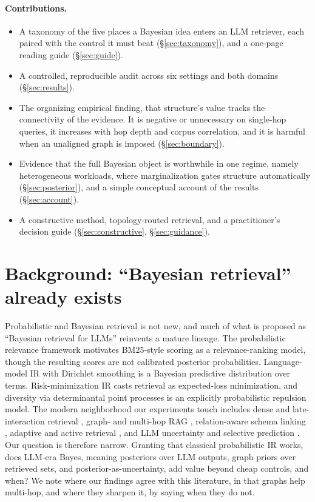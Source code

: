\documentclass[11pt]{article}
\begin{document}
\paragraph{Contributions.}
\begin{itemize}[leftmargin=1.4em,itemsep=2pt]
\item A taxonomy of the five places a Bayesian idea enters an LLM retriever, each paired with the
control it must beat (\S\ref{sec:taxonomy}), and a one-page reading guide (\S\ref{sec:guide}).
\item A controlled, reproducible audit across six settings and both domains (\S\ref{sec:results}).
\item The organizing empirical finding, that structure's value tracks the connectivity of the
evidence. It is negative or unnecessary on single-hop queries, it increases with hop depth and corpus
correlation, and it is harmful when an unaligned graph is imposed (\S\ref{sec:boundary}).
\item Evidence that the full Bayesian object is worthwhile in one regime, namely heterogeneous
workloads, where marginalization gates structure automatically (\S\ref{sec:posterior}), and a simple
conceptual account of the results (\S\ref{sec:account}).
\item A constructive method, topology-routed retrieval, and a practitioner's decision guide
(\S\ref{sec:constructive}, \S\ref{sec:guidance}).
\end{itemize}

\section{Background: ``Bayesian retrieval'' already exists}\label{sec:background}

Probabilistic and Bayesian retrieval is not new, and much of what is proposed as ``Bayesian retrieval
for LLMs'' reinvents a mature lineage. The probabilistic relevance framework
\citep{robertson1976relevance} motivates BM25-style scoring \citep{robertson2009bm25} as a
relevance-ranking model, though the resulting scores are not calibrated posterior probabilities.
Language-model IR \citep{ponte1998lm} with Dirichlet smoothing \citep{zhai2004smoothing} is a Bayesian
predictive distribution over terms. Risk-minimization IR \citep{zhai2006risk} casts retrieval as
expected-loss minimization, and diversity via determinantal point processes \citep{kulesza2012dpp} is
an explicitly probabilistic repulsion model. The modern neighborhood our experiments touch includes
dense and late-interaction retrieval \citep{khattab2020colbert}, graph- and multi-hop RAG
\citep{edge2024graphrag,gutierrez2024hipporag}, relation-aware schema linking \citep{wang2020ratsql},
adaptive and active retrieval \citep{jiang2023flare}, and LLM uncertainty and selective prediction
\citep{kuhn2023semantic,wang2023selfconsistency,angelopoulos2021ltt}. Our question is therefore narrow.
Granting that classical probabilistic IR works, does LLM-era Bayes, meaning posteriors over LLM
outputs, graph priors over retrieved sets, and posterior-as-uncertainty, add value beyond cheap
controls, and when? We note where our findings agree with this literature, in that graphs help
multi-hop, and where they sharpen it, by saying when they do not.
\end{document}
